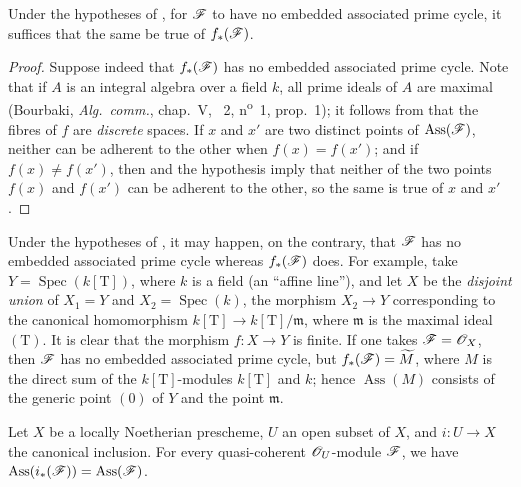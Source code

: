 \begin{corollary}[3.1.11]
\label{IV.3.1.11}
Under the hypotheses of , for $\mathscr{F}$ to have no embedded associated prime cycle, it suffices that the same be true of $f_*(\mathscr{F})$.
\end{corollary}

\begin{proof}
Suppose indeed that $f_*(\mathscr{F})$ has no embedded associated prime cycle.
Note that if $A$ is an integral algebra over a field $k$, all prime ideals of $A$ are maximal (Bourbaki, \emph{Alg.\ comm.}, chap.~V, \textsection~2, n\textsuperscript{o}~1, prop.~1); it follows from  that the fibres of $f$ are \emph{discrete} spaces. If $x$ and $x'$ are two distinct points of $\operatorname{Ass}(\mathscr{F})$, neither can be adherent to the other when $f(x)=f(x')$; and if $f(x)\neq f(x')$, then  and the hypothesis imply that neither of the two points $f(x)$ and $f(x')$ can be adherent to the other, so the same is true of $x$ and $x'$.
\end{proof}

\begin{remark}[3.1.12]
\label{IV.3.1.12}
Under the hypotheses of , it may happen, on the contrary, that $\mathscr{F}$ has no embedded associated prime cycle whereas $f_*(\mathscr{F})$ does.
For example, take $Y=\operatorname{Spec}(k[\mathrm{T}])$, where $k$ is a field (an ``affine line''), and let $X$ be the \emph{disjoint union} of $X_1=Y$ and $X_2=\operatorname{Spec}(k)$, the morphism $X_2\to Y$ corresponding to the canonical homomorphism $k[\mathrm{T}]\to k[\mathrm{T}]/\mathfrak{m}$, where $\mathfrak{m}$ is the maximal ideal $(\mathrm{T})$.
It is clear that the morphism $f:X\to Y$ is finite. If one takes $\mathscr{F}=\mathscr{O}_X$, then $\mathscr{F}$ has no embedded associated prime cycle, but $f_*(\mathscr{F})=\widetilde{M}$, where $M$ is the direct sum of the $k[\mathrm{T}]$-modules $k[\mathrm{T}]$ and $k$; hence $\operatorname{Ass}(M)$ consists of the generic point $(0)$ of $Y$ and the point $\mathfrak{m}$.
\end{remark}

\begin{proposition}[3.1.13]
\label{IV.3.1.13}
Let $X$ be a locally Noetherian prescheme, $U$ an open subset of $X$, and $i:U\to X$ the canonical inclusion.
For every quasi-coherent $\mathscr{O}_U$-module $\mathscr{F}$, we have $\operatorname{Ass}(i_*(\mathscr{F}))=\operatorname{Ass}(\mathscr{F})$.
\end{proposition}

